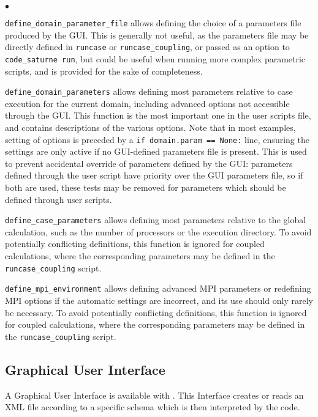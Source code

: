 {{{\begin{list}{$\bullet$}{}
\item \texttt{define\_domain\_parameter\_file} allows defining
 the choice of a parameters file produced by the GUI. This is
 generally not useful, as the parameters file may be directly
 defined in \texttt{runcase} or \texttt{runcase\_coupling}, or passed
 as an option to \texttt{code\_saturne run}, but could be useful
 when running more complex parametric scripts, and is provided for
 the sake of completeness.
\item \texttt{define\_domain\_parameters} allows defining
 most parameters relative to case execution for the current
 domain, including advanced options not accessible
 through the GUI. This function is the most important one in the user
 scripts file, and contains descriptions of the various options.
 Note that in most examples, setting of options is preceded by
 a \texttt{if domain.param == None:} line, ensuring the settings
 are only active if no GUI-defined parameters file is present.
 This is used to prevent accidental override of parameters defined
 by the GUI: parameters defined through the user script have priority
 over the GUI parameters file, so if both are used, these tests
 may be removed for parameters which should be defined through
 user scripts.
\item \texttt{define\_case\_parameters} allows defining
 most parameters relative to the global calculation, such as
 the number of processors or the execution directory.
 To avoid potentially conflicting definitions, this function is ignored
 for coupled calculations, where the corresponding parameters
 may be defined in the \texttt{runcase\_coupling} script.
\item \texttt{define\_mpi\_environment} allows defining
 advanced MPI parameters or redefining MPI options if the automatic
 settings are incorrect, and its use should only rarely be necessary.
 To avoid potentially conflicting definitions, this function is ignored
 for coupled calculations, where the corresponding parameters
 may be defined in the \texttt{runcase\_coupling} script.
\end{list}

\subsection{Graphical User Interface}
\label{sec:prg_gui}%
A Graphical User Interface is available with \CS.
This Interface creates or reads an XML file according to
a specific \CS schema which is then interpreted by the code.

}}}
